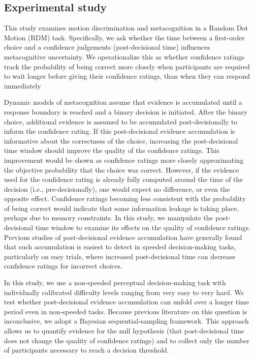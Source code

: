 \documentclass[
]{article}
\begin{document}
\subsection{Experimental study}\label{experimental-study}

This study examines motion discrimination and metacognition in a Random
Dot Motion (RDM) task. Specifically, we ask whether the time between a
first-order choice and a confidence judgements (post-decisional time)
influences metacognitive uncertainty. We operationalize this as whether
confidence ratings track the probability of being correct more closely
when participants are required to wait longer before giving their
confidence ratings, than when they can respond immediately

Dynamic models of metacognition assume that evidence is accumulated
until a response boundary is reached and a binary decision is initiated.
After the binary choice, additional evidence is assumed to be
accumulated post-decisionally to inform the confidence rating. If this
post-decisional evidence accumulation is informative about the
correctness of the choice, increasing the post-decisional time window
should improve the quality of the confidence ratings. This improvement
would be shown as confidence ratings more closely approximating the
objective probability that the choice was correct. However, if the
evidence used for the confidence rating is already fully computed around
the time of the decision (i.e., pre-decisionally), one would expect no
difference, or even the opposite effect. Confidence ratings becoming
less consistent with the probability of being correct would indicate
that some information leakage is taking place, perhaps due to memory
constraints. In this study, we manipulate the post-decisional time
window to examine its effects on the quality of confidence ratings.
Previous studies of post-decisional evidence accumulation have generally
found that such accumulation is easiest to detect in speeded
decision-making tasks, particularly on easy trials, where increased
post-decisional time can decrease confidence ratings for incorrect
choices.

In this study, we use a non-speeded perceptual decision-making task with
individually calibrated difficulty levels ranging from very easy to very
hard. We test whether post-decisional evidence accumulation can unfold
over a longer time period even in non-speeded tasks. Because previous
literature on this question is inconclusive, we adopt a Bayesian
sequential-sampling framework. This approach allows us to quantify
evidence for the null hypothesis (that post-decisional time does not
change the quality of confidence ratings) and to collect only the number
of participants necessary to reach a decision threshold.
\end{document}
